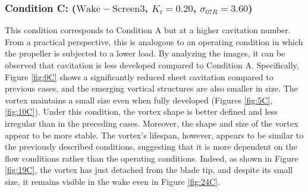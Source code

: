 \subsubsection{Condition C: ($\mathrm{Wake-Screen3}$, $K_t = 0.20$, $\sigma_{07R} = 3.60$)}
\label{sez:C}

This condition corresponds to Condition A but at a higher cavitation number. From a practical perspective, this is analogous to an operating condition in which the propeller is subjected to a lower load.
By analyzing the images, it can be observed that cavitation is less developed compared to Condition A. Specifically, Figure \ref{fig:0C} shows a significantly reduced sheet cavitation compared to previous cases, and the emerging vortical structures are also smaller in size.
The vortex maintains a small size even when fully developed (Figures \ref{fig:5C}, \ref{fig:10C}). Under this condition, the vortex shape is better defined and less irregular than in the preceding cases. Moreover, the shape and size of the vortex appear to be more stable.
The vortex's lifespan, however, appears to be similar to the previously described conditions, suggesting that it is more dependent on the flow conditions rather than the operating conditions. Indeed, as shown in Figure \ref{fig:19C}, the vortex has just detached from the blade tip, and despite its small size, it remains visible in the wake even in Figure \ref{fig:24C}.

